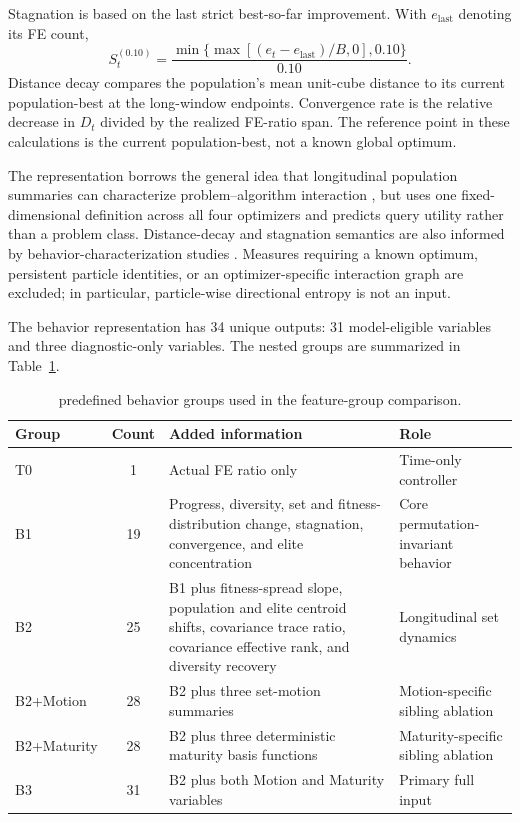 Stagnation is based on the last strict best-so-far improvement.  With $e_{\mathrm{last}}$ denoting its FE count,
\begin{equation}
  S_t^{(0.10)}=
  \frac{\min\{\max[(e_t-e_{\mathrm{last}})/B,0],0.10\}}{0.10}.
  \label{eq:stagnation}
\end{equation}
Distance decay compares the population's mean unit-cube distance to its current population-best at the long-window endpoints.  Convergence rate is the relative decrease in $D_t$ divided by the realized FE-ratio span.  The reference point in these calculations is the current population-best, not a known global optimum.

The representation borrows the general idea that longitudinal population
summaries can characterize problem--algorithm interaction
\cite{cenikjDynamoRepTrajectoryBasedPopulation2023}, but uses one fixed-dimensional
definition across all four optimizers and predicts query utility rather than a
problem class.  Distance-decay and stagnation semantics are also informed by
behavior-characterization studies
\cite{haywardDeterminingMetaheuristicSimilarity2025,mbassoHowMetaheuristicsExploit2026}.
Measures requiring a known optimum, persistent particle identities, or an
optimizer-specific interaction graph are excluded; in particular, particle-wise
directional entropy is not an input.

The behavior representation has 34 unique outputs: 31 model-eligible variables and three diagnostic-only variables.  The nested groups are summarized in Table~\ref{tab:behavior-groups}.

\begin{table}[t]
  \caption{predefined behavior groups used in the feature-group comparison.}
  \label{tab:behavior-groups}
  \centering
  \small
  \begin{tabularx}{\textwidth}{@{}l c X X@{}}
    \toprule
    Group & Count & Added information & Role \\
    \midrule
    T0 & 1 & Actual FE ratio only & Time-only controller \\
    B1 & 19 & Progress, diversity, set and fitness-distribution change, stagnation, convergence, and elite concentration & Core permutation-invariant behavior \\
    B2 & 25 & B1 plus fitness-spread slope, population and elite centroid shifts, covariance trace ratio, covariance effective rank, and diversity recovery & Longitudinal set dynamics \\
    B2+Motion & 28 & B2 plus three set-motion summaries & Motion-specific sibling ablation \\
    B2+Maturity & 28 & B2 plus three deterministic maturity basis functions & Maturity-specific sibling ablation \\
    B3 & 31 & B2 plus both Motion and Maturity variables & Primary full input \\
    \bottomrule
  \end{tabularx}
\end{table}

